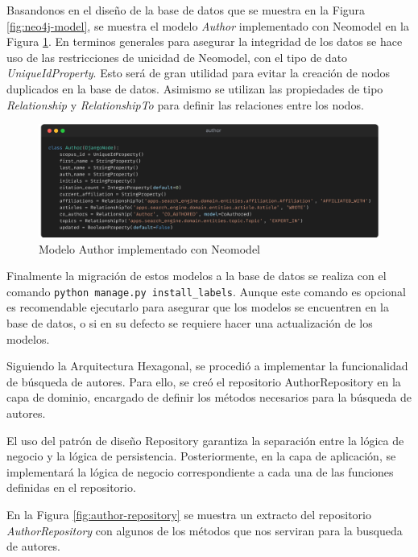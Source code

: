 Basandonos en el diseño de la base de datos que se muestra en la Figura \ref{fig:neo4j-model},
se muestra el modelo \textit{Author} implementado con Neomodel en la Figura \ref{fig:author-model}.
En terminos generales para asegurar la integridad de los datos se hace uso  de las restricciones de unicidad de Neomodel, con el tipo de dato \textit{UniqueIdProperty}.
Esto será de gran utilidad para evitar la creación de nodos duplicados en la base de datos.
Asimismo se utilizan las propiedades de tipo \textit{Relationship} y \textit{RelationshipTo} para definir las relaciones entre los nodos.

\begin{figure}[H]
    \centering
    \includegraphics[scale=0.12]{../02Figures/02Chapter/Sprints/Sprint-3/author-neomodel.png}
    \caption{Modelo Author implementado con Neomodel}
    \label{fig:author-model}
\end{figure}

Finalmente la migración de estos modelos a la base de datos se realiza con el comando \texttt{python manage.py install\_labels}.
Aunque este comando es opcional es recomendable ejecutarlo para asegurar que los modelos se encuentren en la base de datos, o si en su defecto se requiere hacer una actualización de los modelos.

Siguiendo la Arquitectura Hexagonal, se procedió a implementar la funcionalidad de búsqueda de autores.
Para ello, se creó el repositorio AuthorRepository en la capa de dominio, encargado de definir los métodos necesarios para la búsqueda de autores.

El uso del patrón de diseño Repository garantiza la separación entre la lógica de negocio y la lógica de persistencia. Posteriormente, en la capa de aplicación, se implementará la lógica de negocio correspondiente a cada una de las funciones definidas en el repositorio.

En la Figura \ref{fig:author-repository} se muestra un extracto del repositorio \textit{AuthorRepository} con algunos de los métodos que nos serviran para la busqueda de autores.

